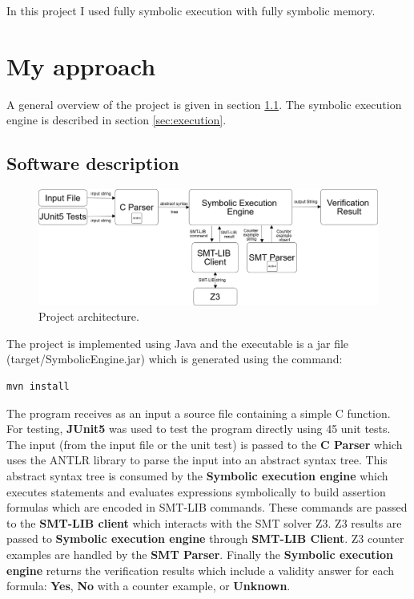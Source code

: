 \documentclass[12pt,a4paper]{article}
\begin{document}
In this project I used fully symbolic execution with fully symbolic memory. 

\section{My approach}

A general overview of the project is given in section \ref{sec:software}. The symbolic execution engine is described in section \ref{sec:execution}.

\subsection{Software description} \label{sec:software}


\begin{figure}[h]
 \centering
 \includegraphics[scale=.25,keepaspectratio=true]{./engine.png}
 \caption{Project architecture.}
 \label{fig:engine}
\end{figure}

The project is implemented using Java and the executable is a jar file (target/SymbolicEngine.jar) which is generated using the command:

\begin{lstlisting}  
mvn install
\end{lstlisting}  

The program receives as an input a source file containing a simple C function. For testing, \textbf{JUnit5} was used to test the program directly using 45 unit tests. The input (from the input file or the unit test) is passed to the \textbf{C Parser} which uses the ANTLR library to parse the input into an abstract syntax tree. This abstract syntax tree is consumed by the \textbf{Symbolic execution engine} which executes statements and evaluates expressions symbolically to build assertion formulas which are encoded in SMT-LIB commands. These commands are passed to the \textbf{SMT-LIB client} which interacts with the SMT solver Z3.  
Z3 results are passed to \textbf{Symbolic execution engine} through \textbf{SMT-LIB Client}. Z3 counter examples are handled by the \textbf{SMT Parser}. Finally the \textbf{Symbolic execution engine} returns the verification results which include a validity answer for each formula: \textbf{Yes}, \textbf{No} with a counter example, or \textbf{Unknown}. 
\end{document}
